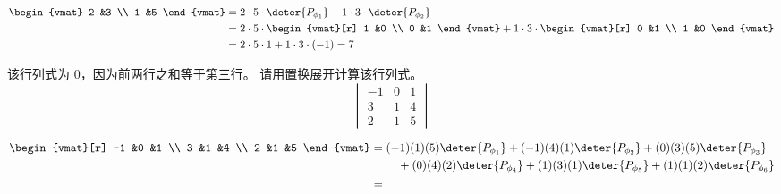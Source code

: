 \begin{exercises}
\begin{answer}
\begin{align*}
\begin{vmat}
          2  &3 \\
          1  &5
        \end{vmat}
        &=
        2\cdot 5\cdot\deter{P_{\phi_1}}
        +
        1\cdot 3\cdot\deter{P_{\phi_2}}      \\
        &=
        2\cdot 5\cdot\begin{vmat}[r]
                           1  &0 \\
                           0  &1
                         \end{vmat}
        +
        1\cdot 3\cdot\begin{vmat}[r]
                           0  &1 \\
                           1  &0
                         \end{vmat}               \\
        &=2\cdot 5\cdot 1+1\cdot 3\cdot (-1)=7
        \end{align*}
    \end{answer}
  \item 该行列式为 $0$，因为前两行之和等于第三行。
    请用置换展开计算该行列式。
    \begin{equation*}
      \begin{vmatrix}
        -1 &0 &1 \\
        3  &1 &4 \\
        2  &1 &5
      \end{vmatrix}
    \end{equation*}
    \begin{answer}
          \begin{align*}
            \begin{vmat}[r]
              -1  &0  &1  \\
               3  &1  &4  \\
               2  &1  &5
            \end{vmat}
            &=
            \begin{aligned}[t]
              &(-1)(1)(5)\deter{P_{\phi_1}}
              +(-1)(4)(1)\deter{P_{\phi_2}}
              +(0)(3)(5)\deter{P_{\phi_3}}  \\
              &\hbox{}\quad\hbox{}
              +(0)(4)(2)\deter{P_{\phi_4}}
              +(1)(3)(1)\deter{P_{\phi_5}}
              +(1)(1)(2)\deter{P_{\phi_6}}
            \end{aligned}                        \\
            &=
            \begin{aligned}[t]

\end{aligned}
\end{align*}
\end{answer}
\end{exercises}
